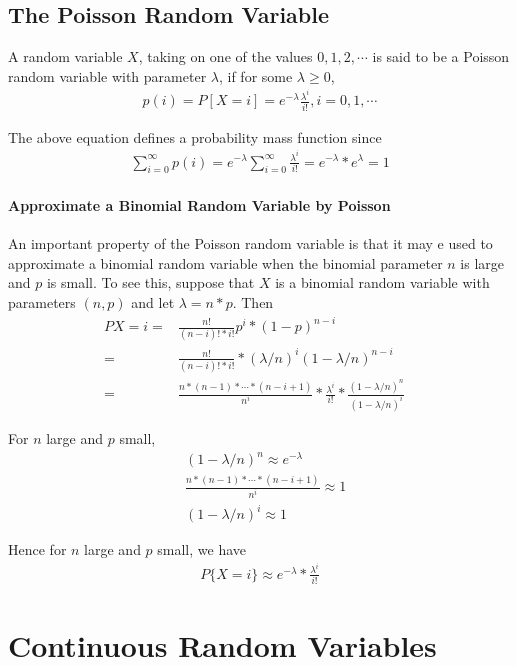\documentclass[10 pt,final]{article}
\newcommand{\impo}[1]{{\color{magenta} #1}}
\begin{document}
\subsection{The Poisson Random Variable}
A random variable $X$, taking on one of the values $0,1,2, \cdots$ is said to be a Poisson random variable with parameter $\lambda$, if for some $\lambda \ge 0$, 
\begin{align*}
p(i) = P[X = i] = e^{-\lambda} \frac{\lambda^i}{i!}, i =0,1, \cdots
\end{align*}

The above equation defines a probability mass function since
\begin{align*}
\sum^{\infty}_{i=0} p(i) = e^{-\lambda} \sum^{\infty}_{i=0} \frac{\lambda^i}{i!} = e^{-\lambda}*e^{\lambda} = 1
\end{align*}

\paragraph{\impo{Approximate a Binomial Random Variable by Poisson}} An important property of the Poisson random variable is that it may e used to approximate a binomial random variable when the binomial parameter \impo{$n$ is large and $p$ is small}. To see this, suppose that $X$ is a binomial random variable with parameters $(n,p)$ and let $\lambda = n*p$. Then
\begin{align*}
P{X = i} = & \frac{n!}{(n-i)!*i!} p^i *(1-p)^{n-i} & \\
= & \frac{n!}{(n-i)!*i!}*(\lambda/n)^i(1-\lambda/n)^{n-i}&\\
= &\frac{n*(n-1)*\cdots*(n-i+1)}{n^i} *\frac{\lambda^i}{i!}*\frac{(1-\lambda/n)^n}{(1-\lambda/n)^i}
\end{align*}

For $n$ large and $p$ small, 
\begin{align*}
&(1-\lambda/n)^n \approx e^{-\lambda} \\
&\frac{n*(n-1)*\cdots*(n-i+1)}{n^i} \approx 1 \\
&(1-\lambda/n)^i \approx 1
\end{align*}

Hence for $n$ large and $p$ small, we have 
\begin{align*}
P\{X=i\} \approx e^{-\lambda}*\frac{\lambda^i}{i!}
\end{align*}


\section{Continuous Random Variables}
\end{document}
